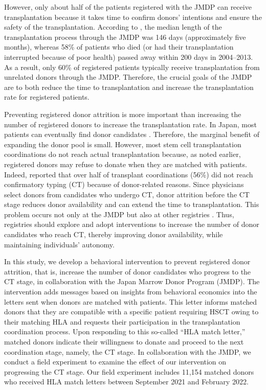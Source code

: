 \documentclass[12pt, a4paper]{article}
\begin{document}
However, only about half of the patients registered with the JMDP can receive transplantation because it takes time to confirm donors' intentions and ensure the safety of the transplantation. According to \citet{Hirakawa2018}, the median length of the transplantation process through the JMDP was 146 days (approximately five months), whereas 58\% of patients who died (or had their transplantation interrupted because of poor health) passed away within 200 days in 2004--2013. As a result, only 60\% of registered patients typically receive transplantation from unrelated donors through the JMDP. Therefore, the crucial goals of the JMDP are to both reduce the time to transplantation and increase the transplantation rate for registered patients.

Preventing registered donor attrition is more important than increasing the number of registered donors to increase the transplantation rate. In Japan, most patients can eventually find donor candidates \citep{Takanashi2016}. Therefore, the marginal benefit of expanding the donor pool is small. However, most stem cell transplantation coordinations do not reach actual transplantation because, as noted earlier, registered donors may refuse to donate when they are matched with patients. Indeed, \citet{Hirakawa2018} reported that over half of transplant coordinations (56\%) did not reach confirmatory typing (CT) because of donor-related reasons. Since physicians select donors from candidates who undergo CT, donor attrition before the CT stage reduces donor availability and can extend the time to transplantation. This problem occurs not only at the JMDP but also at other registries \citep[for example,][]{Balassa2019, Hamed2023, Haylock2024}. Thus, registries should explore and adopt interventions to increase the number of donor candidates who reach CT, thereby improving donor availability, while maintaining individuals' autonomy.

In this study, we develop a behavioral intervention to prevent registered donor attrition, that is, increase the number of donor candidates who progress to the CT stage, in collaboration with the Japan Marrow Donor Program (JMDP). The intervention adds messages based on insights from behavioral economics into the letters sent when donors are matched with patients. This letter informs matched donors that they are compatible with a specific patient requiring HSCT owing to their matching HLA and requests their participation in the transplantation coordination process. Upon responding to this so-called ``HLA match letter,'' matched donors indicate their willingness to donate and proceed to the next coordination stage, namely, the CT stage. In collaboration with the JMDP, we conduct a field experiment to examine the effect of our intervention on progressing the CT stage. Our field experiment includes 11,154 matched donors who received HLA match letters between September 2021 and February 2022.
\end{document}
